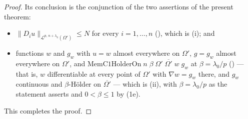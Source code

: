 \begin{proof}
Its conclusion is the conjunction of the two assertions of the present theorem:
\begin{itemize}
\item $\|D_iu\|_{\mathcal L^{p,\,n+\lambda_0}(\Omega')}\le N$ for every
  $i=1,\dots,n$ (), which is (i); and
\item functions $w$ and $g_w$ with $u=w$ almost everywhere on $\Omega'$,
  $g=g_w$ almost everywhere on $\Omega'$, and
  $\mathrm{MemC1HolderOn}\;n\;\beta\;\Omega'\;\overline{\Omega'}\;w\;g_w$ at
  $\beta=\lambda_0/p$ () --- that is, $w$ differentiable
  at every point of $\Omega'$ with $\nabla w=g_w$ there, and $g_w$ continuous
  and $\beta$-H\"older on $\overline{\Omega'}$ --- which is (ii), with
  $\beta=\lambda_0/p$ as the statement asserts and $0<\beta\le1$ by (1e).
\end{itemize}
This completes the proof.
\end{proof}
